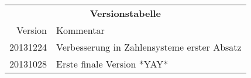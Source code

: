 \begin{table}[htp]
\centering
\begin{tabular}{rl}
\multicolumn{2}{c}{\textbf{Versionstabelle}} \\
Version & Kommentar \\ \hline
20131224 & Verbesserung in Zahlensysteme erster Absatz \\
20131028 & Erste finale Version *YAY* \\
\end{tabular}
\end{table}